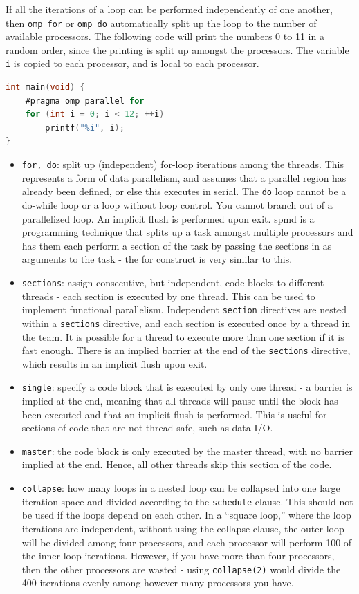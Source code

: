 \documentclass[10pt]{article}
\begin{document}
\begin{flushleft}
If all the iterations of a loop can be performed independently of one another, then {\tt omp for} or {\tt omp do} automatically split up the loop to the number of available processors. The following code will print the numbers 0 to 11 in a random order, since the printing is split up amongst the processors. The variable {\tt i} is copied to each processor, and is local to each processor.

\begin{lstlisting}[language=C, basicstyle=\ttfamily\small]
int main(void) {
	#pragma omp parallel for
	for (int i = 0; i < 12; ++i)
		printf("%i", i);
}
\end{lstlisting}

\begin{itemize}
\item {\tt for, do}: split up (independent) for-loop iterations among the threads. This represents a form of data parallelism, and assumes that a parallel region has already been defined, or else this executes in serial. The {\tt do} loop cannot be a do-while loop or a loop without loop control. You cannot branch out of a parallelized loop. An implicit flush is performed upon exit. \gls{spmd} is a programming technique that splits up a task amongst multiple processors and has them each perform a section of the task by passing the sections in as arguments to the task - the for construct is very similar to this.
\item {\tt sections}: assign consecutive, but independent, code blocks to different threads - each section is executed by one thread. This can be used to implement functional parallelism. Independent {\tt section} directives are nested within a {\tt sections} directive, and each section is executed once by a thread in the team. It is possible for a thread to execute more than one section if it is fast enough. There is an implied barrier at the end of the {\tt sections} directive, which results in an implicit flush upon exit.
\item {\tt single}: specify a code block that is executed by only one thread - a barrier is implied at the end, meaning that all threads will pause until the block has been executed and that an implicit flush is performed. This is useful for sections of code that are not thread safe, such as data I/O. 
\item {\tt master}: the code block is only executed by the master thread, with no barrier implied at the end. Hence, all other threads skip this section of the code.
\item {\tt collapse}: how many loops in a nested loop can be collapsed into one large iteration space and divided according to the {\tt schedule} clause. This should not be used if the loops depend on each other. In a ``square loop,'' where the loop iterations are independent, without using the collapse clause, the outer loop will be divided among four processors, and each processor will perform 100 of the inner loop iterations. However, if you have more than four processors, then the other processors are wasted - using {\tt collapse(2)} would divide the 400 iterations evenly among however many processors you have.


\end{itemize}
\end{flushleft}
\end{document}
